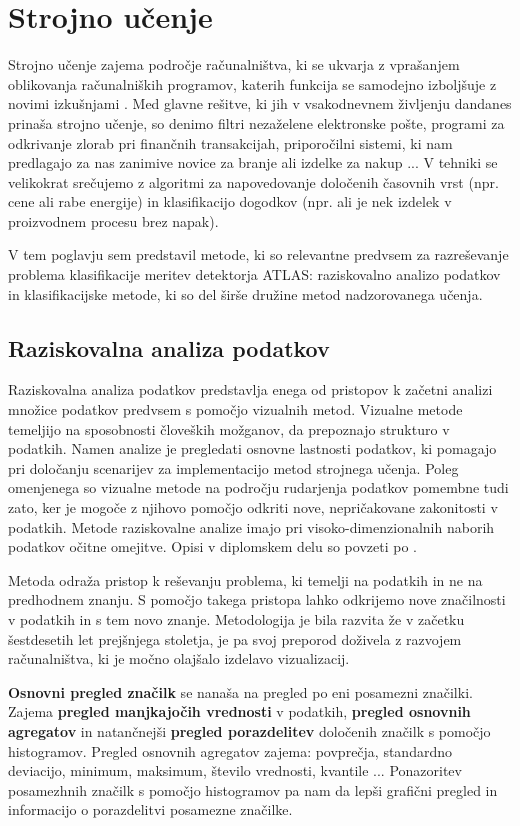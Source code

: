 \documentclass[11pt,a4paper,openany]{book}
\begin{document}
\chapter{Strojno učenje}

Strojno učenje zajema področje računalništva, ki se ukvarja z vprašanjem oblikovanja računalniških programov, katerih funkcija se samodejno izboljšuje z novimi izkušnjami \cite{Mitchell1997}\cite{Witten2005}. Med glavne rešitve, ki jih v vsakodnevnem življenju dandanes prinaša strojno učenje, so denimo filtri nezaželene elektronske pošte, programi za odkrivanje zlorab pri finančnih transakcijah, priporočilni sistemi, ki nam predlagajo za nas zanimive novice za branje ali izdelke za nakup ... V tehniki se velikokrat srečujemo z algoritmi za napovedovanje določenih časovnih vrst (npr. cene ali rabe energije) in klasifikacijo dogodkov (npr. ali je nek izdelek v proizvodnem procesu brez napak).

V tem poglavju sem predstavil metode, ki so relevantne predvsem za razreševanje problema klasifikacije meritev detektorja ATLAS: raziskovalno analizo podatkov in klasifikacijske metode, ki so del širše družine metod nadzorovanega učenja. 

\section{Raziskovalna analiza podatkov}
Raziskovalna analiza podatkov predstavlja enega od pristopov k začetni analizi množice podatkov predvsem s pomočjo vizualnih metod. Vizualne metode temeljijo na sposobnosti človeških možganov, da prepoznajo strukturo v podatkih. Namen analize je pregledati osnovne lastnosti podatkov, ki pomagajo pri določanju scenarijev za implementacijo metod strojnega učenja. Poleg omenjenega so vizualne metode na področju rudarjenja podatkov pomembne tudi zato, ker je mogoče z njihovo pomočjo odkriti nove, nepričakovane zakonitosti v podatkih. Metode raziskovalne analize imajo pri visoko-dimenzionalnih naborih podatkov očitne omejitve. Opisi v diplomskem delu so povzeti po \cite{hand2001}.

Metoda odraža pristop k reševanju problema, ki temelji na podatkih in ne na predhodnem znanju. S pomočjo takega pristopa lahko odkrijemo nove značilnosti v podatkih in s tem novo znanje. Metodologija je bila razvita že v začetku šestdesetih let prejšnjega stoletja, je pa svoj preporod doživela z razvojem računalništva, ki je močno olajšalo izdelavo vizualizacij. 

\textbf{Osnovni pregled značilk} se nanaša na pregled po eni posamezni značilki. Zajema \textbf{pregled manjkajočih vrednosti} v podatkih, \textbf{pregled osnovnih agregatov} in natančnejši \textbf{pregled porazdelitev} določenih značilk s pomočjo histogramov. Pregled osnovnih agregatov zajema: povprečja, standardno deviacijo, minimum, maksimum, število vrednosti, kvantile ... Ponazoritev posamezhnih značilk s pomočjo histogramov pa nam da lepši grafični pregled in informacijo o porazdelitvi posamezne značilke.
\end{document}
